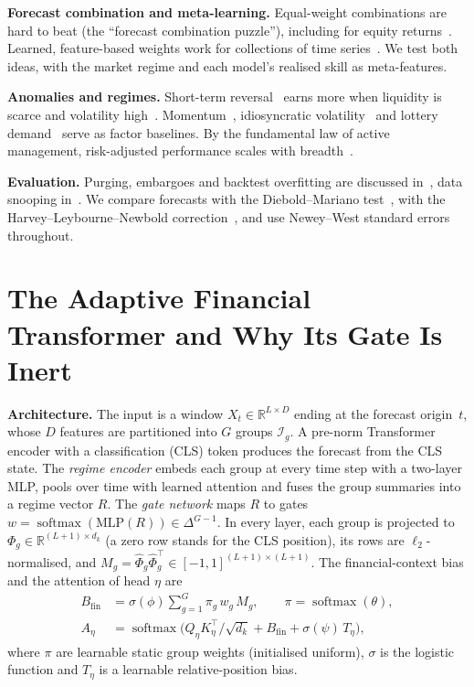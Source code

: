 \textbf{Forecast combination and meta-learning.} Equal-weight combinations are hard to beat (the ``forecast combination puzzle''), including for equity returns~\cite{rapach2010}. Learned, feature-based weights work for collections of time series~\cite{montero2020}. We test both ideas, with the market regime and each model's realised skill as meta-features.

\textbf{Anomalies and regimes.} Short-term reversal~\cite{jegadeesh1990,lehmann1990} earns more when liquidity is scarce and volatility high~\cite{nagel2012}. Momentum~\cite{jegadeesh1993}, idiosyncratic volatility~\cite{ang2006} and lottery demand~\cite{bali2011} serve as factor baselines. By the fundamental law of active management, risk-adjusted performance scales with breadth~\cite{grinold2000}.

\textbf{Evaluation.} Purging, embargoes and backtest overfitting are discussed in~\cite{deprado2018,bailey2014}, data snooping in~\cite{white2000,harvey2016}. We compare forecasts with the Diebold--Mariano test~\cite{diebold1995}, with the Harvey--Leybourne--Newbold correction~\cite{harvey1997}, and use Newey--West standard errors~\cite{newey1987} throughout.

\section{The Adaptive Financial Transformer and Why Its Gate Is Inert}
\label{sec:aft}
\textbf{Architecture.} The input is a window $X_t\in\mathbb{R}^{L\times D}$ ending at the forecast origin~$t$, whose $D$ features are partitioned into $G$ groups $\mathcal{I}_g$. A pre-norm Transformer encoder with a classification (CLS) token produces the forecast from the CLS state. The \emph{regime encoder} embeds each group at every time step with a two-layer MLP, pools over time with learned attention and fuses the group summaries into a regime vector $R$. The \emph{gate network} maps $R$ to gates $w=\operatorname{softmax}(\mathrm{MLP}(R))\in\Delta^{G-1}$. In every layer, each group is projected to $\Phi_g\in\mathbb{R}^{(L+1)\times d_k}$ (a zero row stands for the CLS position), its rows are $\ell_2$-normalised, and $M_g=\hat\Phi_g\hat\Phi_g^\top\in[-1,1]^{(L+1)\times(L+1)}$. The financial-context bias and the attention of head $\eta$ are
\begin{align}
B_{\mathrm{fin}}&=\sigma(\phi)\textstyle\sum_{g=1}^{G}\pi_g\,w_g\,M_g,\qquad \pi=\operatorname{softmax}(\theta),\label{eq:bfin}\\
A_\eta&=\operatorname{softmax}\big(Q_\eta K_\eta^\top/\sqrt{d_k}+B_{\mathrm{fin}}+\sigma(\psi)\,T_\eta\big),\label{eq:attn}
\end{align}
where $\pi$ are learnable static group weights (initialised uniform), $\sigma$ is the logistic function and $T_\eta$ is a learnable relative-position bias.

